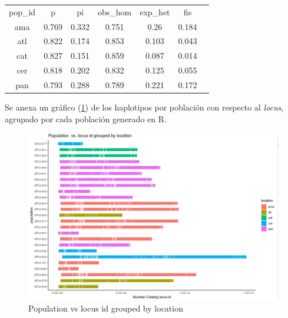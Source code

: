 \documentclass{article}
\begin{document}
\begin{table}[]
\begin{tabular}{ccccccl}
pop\_id & p     & pi    & obs\_hom & exp\_het & fis   &  \\ \cline{1-6}
ama     & 0.769 & 0.332 & 0.751    & 0.26     & 0.184 &  \\
atl     & 0.822 & 0.174 & 0.853    & 0.103    & 0.043 &  \\
cat     & 0.827 & 0.151 & 0.859    & 0.087    & 0.014 &  \\
cer     & 0.818 & 0.202 & 0.832    & 0.125    & 0.055 &  \\
pan     & 0.793 & 0.288 & 0.789    & 0.221    & 0.172 & 
\end{tabular}
\end{table}



Se anexa un gráfico (\ref{fig:fig1})  de los haplotipos por población con respecto al \textit{locus}, agrupado por cada población generado en R.

\begin{figure}[h]
    \centering
    \includegraphics[width=1.5\textwidth]{haplotypes_1.png}
    \caption{Population vs locus id grouped by location}
    \label{fig:fig1}
\end{figure}
\end{document}
